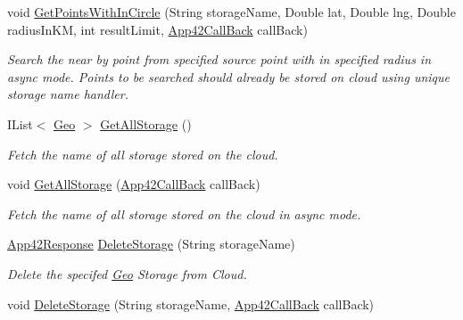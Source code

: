 \begin{DoxyCompactItemize}
void \hyperlink{classcom_1_1shephertz_1_1app42_1_1paas_1_1sdk_1_1csharp_1_1geo_1_1_geo_service_a96c3fcc1bd6a04dd24c93ac8807623fb}{Get\+Points\+With\+In\+Circle} (String storage\+Name, Double lat, Double lng, Double radius\+In\+K\+M, int result\+Limit, \hyperlink{interfacecom_1_1shephertz_1_1app42_1_1paas_1_1sdk_1_1csharp_1_1_app42_call_back}{App42\+Call\+Back} call\+Back)
\begin{DoxyCompactList}\small\item\em Search the near by point from specified source point with in specified radius in async mode. Points to be searched should already be stored on cloud using unique storage name handler. \end{DoxyCompactList}\item 
I\+List$<$ \hyperlink{classcom_1_1shephertz_1_1app42_1_1paas_1_1sdk_1_1csharp_1_1geo_1_1_geo}{Geo} $>$ \hyperlink{classcom_1_1shephertz_1_1app42_1_1paas_1_1sdk_1_1csharp_1_1geo_1_1_geo_service_ae7c86f9fb8fa292f395a113d58bbc932}{Get\+All\+Storage} ()
\begin{DoxyCompactList}\small\item\em Fetch the name of all storage stored on the cloud. \end{DoxyCompactList}\item 
void \hyperlink{classcom_1_1shephertz_1_1app42_1_1paas_1_1sdk_1_1csharp_1_1geo_1_1_geo_service_a65141988baf3d180c2436334917610de}{Get\+All\+Storage} (\hyperlink{interfacecom_1_1shephertz_1_1app42_1_1paas_1_1sdk_1_1csharp_1_1_app42_call_back}{App42\+Call\+Back} call\+Back)
\begin{DoxyCompactList}\small\item\em Fetch the name of all storage stored on the cloud in async mode. \end{DoxyCompactList}\item 
\hyperlink{classcom_1_1shephertz_1_1app42_1_1paas_1_1sdk_1_1csharp_1_1_app42_response}{App42\+Response} \hyperlink{classcom_1_1shephertz_1_1app42_1_1paas_1_1sdk_1_1csharp_1_1geo_1_1_geo_service_acf8edcd86b50604ce5f432d73c69eb0b}{Delete\+Storage} (String storage\+Name)
\begin{DoxyCompactList}\small\item\em Delete the specifed \hyperlink{classcom_1_1shephertz_1_1app42_1_1paas_1_1sdk_1_1csharp_1_1geo_1_1_geo}{Geo} Storage from Cloud. \end{DoxyCompactList}\item 
void \hyperlink{classcom_1_1shephertz_1_1app42_1_1paas_1_1sdk_1_1csharp_1_1geo_1_1_geo_service_a3feb298ae3cbcd5586280a74d6b14cb1}{Delete\+Storage} (String storage\+Name, \hyperlink{interfacecom_1_1shephertz_1_1app42_1_1paas_1_1sdk_1_1csharp_1_1_app42_call_back}{App42\+Call\+Back} call\+Back)

\end{DoxyCompactItemize}
